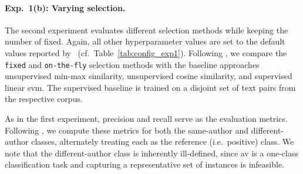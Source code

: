 \paragraph{Exp.\ 1(b): Varying \imp{} selection.}
The second experiment evaluates different \imp{} selection methods while keeping the number of \imps{} fixed.
Again, all other hyperparameter values are set to the default values reported by \citet{koppel_determining_2014}\ (cf.~Table~\ref{tab:config_exp1}). 
Following \citet{koppel_determining_2014}, we compare the \texttt{fixed} and \texttt{on-the-fly} \imp{} selection methods with the baseline approaches unsupervised min-max similarity, unsupervised cosine similarity, and supervised linear \ac{svm}.
The supervised baseline is trained on a disjoint set of text pairs from the respective corpus.

As in the first experiment, precision and recall serve as the evaluation metrics. 
Following \citet{koppel_determining_2014}, we compute these metrics for both the same-author and different-author classes, alternately treating each as the reference (i.e.\ positive) class. 
We note that the different-author class is inherently ill-defined, since \ac{av} is a one-class classification task and capturing a representative set of instances is infeasible.
